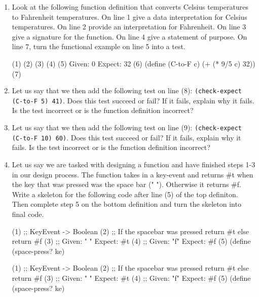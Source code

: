 \documentclass[11pt]{article}
\newcommand{\prog}[1]{\texttt{#1}}
\begin{document}
  \begin{enumerate}

  \item Look at the following function definition that converts
    Celsius temperatures to Fahrenheit temperatures. On line 1
    give a data interpretation for Celsius temperatures. On line 2
    provide an interpretation for Fahrenheit. On line 3 give a signature
    for the function. On line 4 give a statement of purpose. On line 7,
    turn the functional example on line 5 into a test.
    \begin{program}
      (1)
      (2)
      (3)
      (4)
      (5) Given: 0 Expect: 32
      (6) (define (C-to-F c) (+ (* 9/5 c) 32))
      (7)
    \end{program}

  \item Let us say that we then add the following test on line (8):
    \prog{(check-expect (C-to-F 5) 41)}. Does this test succeed or fail?
    If it fails, explain why it fails. Is the test incorrect or is
    the function definition incorrect?

  \item Let us say that we then add the following test on line (9):
    \prog{(check-expect (C-to-F 10) 60)}. Does this test succeed or fail?
    If it fails, explain why it fails. Is the test incorrect or is
    the function definition incorrect?

  \item Let us say we are tasked with designing a function and have finished
    steps 1-3 in our design process. The function takes in a key-event and
    returns \#t when the key that was pressed was the space bar (" "). Otherwise
    it returns \#f. Write a skeleton for the following code after line (5)
    of the top definiton. Then complete step 5 on the bottom definition and
    turn the skeleton into final code.

    \begin{program}
      (1) ;; KeyEvent -> Boolean
      (2) ;; If the spacebar was pressed return #t else return #f
      (3) ;; Given: " " Expect: #t
      (4) ;; Given: "f" Expect: #f
      (5) (define (space-press? ke)





      
    \end{program}

    \begin{program}
      (1) ;; KeyEvent -> Boolean
      (2) ;; If the spacebar was pressed return #t else return #f
      (3) ;; Given: " " Expect: #t
      (4) ;; Given: "f" Expect: #f
      (5) (define (space-press? ke)





      
    \end{program}

  \end{enumerate}
\end{document}
